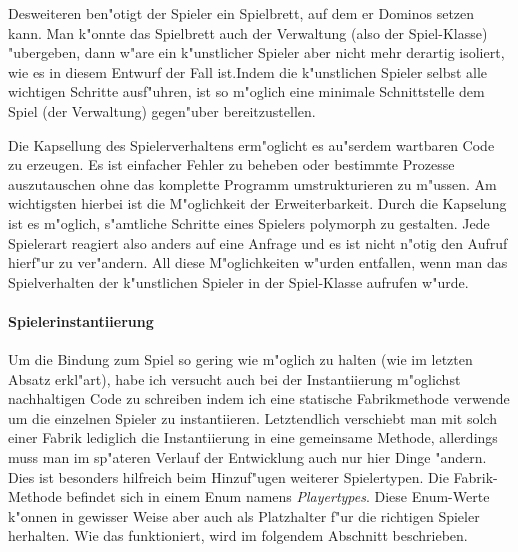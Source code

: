 Desweiteren ben"otigt der Spieler ein Spielbrett, auf dem er Dominos setzen kann. Man k"onnte das Spielbrett auch der Verwaltung (also der Spiel-Klasse) "ubergeben, dann w"are ein k"unstlicher Spieler aber nicht mehr derartig isoliert, wie es in diesem Entwurf der Fall ist.Indem die k"unstlichen Spieler selbst alle wichtigen Schritte ausf"uhren, ist so m"oglich eine minimale Schnittstelle dem Spiel (der Verwaltung) gegen"uber bereitzustellen. 

Die Kapsellung des Spielerverhaltens erm"oglicht es au"serdem wartbaren Code zu erzeugen. Es ist einfacher Fehler zu beheben oder bestimmte Prozesse auszutauschen ohne das komplette Programm umstrukturieren zu m"ussen. Am wichtigsten hierbei ist die M"oglichkeit der Erweiterbarkeit. Durch die Kapselung ist es m"oglich, s"amtliche Schritte eines Spielers polymorph zu gestalten. Jede Spielerart reagiert also anders auf eine Anfrage und es ist nicht n"otig den Aufruf hierf"ur zu ver"andern. All diese M"oglichkeiten w"urden entfallen, wenn man das Spielverhalten der k"unstlichen Spieler in der Spiel-Klasse aufrufen w"urde.

\paragraph{Spielerinstantiierung}
Um die Bindung zum Spiel so gering wie m"oglich zu halten (wie im letzten Absatz erkl"art), habe ich versucht auch bei der Instantiierung m"oglichst nachhaltigen Code zu schreiben indem ich eine statische Fabrikmethode verwende um die einzelnen Spieler zu instantiieren. Letztendlich verschiebt man mit solch einer Fabrik lediglich die Instantiierung in eine gemeinsame Methode, allerdings muss man im sp"ateren Verlauf der Entwicklung auch nur hier Dinge "andern. Dies ist besonders hilfreich beim Hinzuf"ugen weiterer Spielertypen. Die Fabrik-Methode befindet sich in einem Enum namens \emph{Playertypes}. Diese Enum-Werte k"onnen in gewisser Weise aber auch als Platzhalter f"ur die \glqq richtigen\grqq {} Spieler herhalten. Wie das funktioniert, wird im folgendem Abschnitt beschrieben. 

